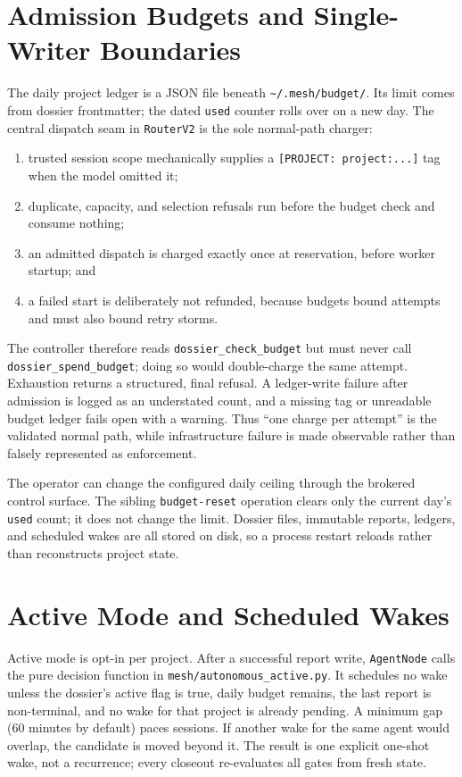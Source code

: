 \documentclass[11pt,letterpaper]{report}
\newcommand{\code}[1]{\texttt{#1}}
\begin{document}
\section{Admission Budgets and Single-Writer Boundaries}

The daily project ledger is a JSON file beneath
\code{\textasciitilde/.mesh/budget/}. Its limit comes from dossier
frontmatter; the dated \code{used} counter rolls over on a new day. The
central dispatch seam in \code{RouterV2} is the sole normal-path charger:

\begin{enumerate}[nosep]
  \item trusted session scope mechanically supplies a
        \code{[PROJECT: project:...]} tag when the model omitted it;
  \item duplicate, capacity, and selection refusals run before the budget
        check and consume nothing;
  \item an admitted dispatch is charged exactly once at reservation, before
        worker startup; and
  \item a failed start is deliberately not refunded, because budgets bound
        attempts and must also bound retry storms.
\end{enumerate}

The controller therefore reads \code{dossier\_check\_budget} but must never
call \code{dossier\_spend\_budget}; doing so would double-charge the same
attempt. Exhaustion returns a structured, final refusal. A ledger-write
failure after admission is logged as an understated count, and a missing tag
or unreadable budget ledger fails open with a warning. Thus ``one charge per
attempt'' is the validated normal path, while infrastructure failure is made
observable rather than falsely represented as enforcement.

The operator can change the configured daily ceiling through the brokered
control surface. The sibling \code{budget-reset} operation clears only the
current day's \code{used} count; it does not change the limit. Dossier files,
immutable reports, ledgers, and scheduled wakes are all stored on disk, so a
process restart reloads rather than reconstructs project state.

\section{Active Mode and Scheduled Wakes}

Active mode is opt-in per project. After a successful report write,
\code{AgentNode} calls the pure decision function in
\code{mesh/autonomous\_active.py}. It schedules no wake unless the dossier's
active flag is true, daily budget remains, the last report is non-terminal,
and no wake for that project is already pending. A minimum gap (60 minutes by
default) paces sessions. If another wake for the same agent would overlap,
the candidate is moved beyond it. The result is one explicit one-shot wake,
not a recurrence; every closeout re-evaluates all gates from fresh state.
\end{document}
